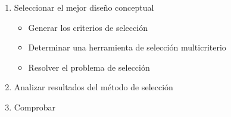 \begin{enumerate}
        \item Seleccionar el mejor diseño conceptual
        \begin{itemize}
            \item Generar los criterios de selección
            \item Determinar una herramienta de selección multicriterio 
            \item Resolver el problema de selección
        \end{itemize}
        
        \item Analizar resultados del método de selección
        
        \item Comprobar
\end{enumerate}